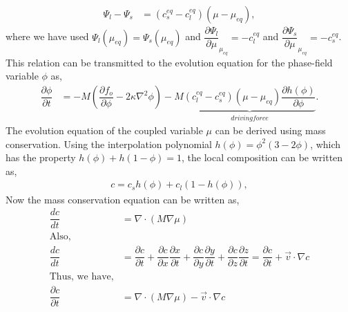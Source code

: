 \documentclass[12pt,a4paper]{report}
\begin{document}
  \begin{align}
   \Psi_l-\Psi_s &= (c_s^{eq} - c_l^{eq})\left(\mu-\mu_{eq}\right),
  \end{align}  
  where we have used $\Psi_l\left(\mu_{eq}\right) = \Psi_s\left(\mu_{eq}\right)$ and $\dfrac{\partial \Psi_l}{\partial \mu}_{\mu_{eq}} = -c_l^{eq}$
  and $\dfrac{\partial \Psi_s}{\partial \mu}_{\mu_{eq}} = -c_s^{eq}$. This relation can be 
  transmitted to the evolution equation for the phase-field variable $\phi$ as,
  \begin{align}
  \dfrac{\partial \phi}{\partial t} &= -M \left(\dfrac{\partial f_o}{\partial \phi} - 2\kappa\nabla^{2}\phi\right)  
					-M\underbrace{(c_l^{eq} - c_s^{eq})\left(\mu-\mu_{eq}\right)\dfrac{\partial h\left(\phi\right)}{\partial \phi}}_{driving force}.
  \end{align}
  The evolution equation of the coupled variable $\mu$ can be derived using mass conservation. 
  Using the interpolation polynomial $h(\phi) = \phi^2\left(3 - 2\phi\right)$, which has the 
  property $h(\phi) + h(1 - \phi) = 1$, the local composition can be written as, 
  \begin{align}
   c = c_s h\left(\phi\right) + c_l (1 - h\left(\phi\right)), 
  \end{align}
Now the mass conservation equation can be written as, 
\begin{align}
 \dfrac{dc}{dt} &= \nabla\cdot\left(M\nabla\mu\right)\\
 \text{Also,}\\
	\dfrac{dc}{dt} &= \dfrac{\partial c}{\partial t} + \dfrac{\partial c}{\partial x}\dfrac{\partial x}{\partial t}
	+\dfrac{\partial c}{\partial y}\dfrac{\partial y}{\partial t}+\dfrac{\partial c}{\partial z}\dfrac{\partial z}{\partial t}
	= \dfrac{\partial c}{\partial t} + \vec{v}\cdot\nabla c\\
	\text{Thus, we have,}\\
	\dfrac{\partial c}{\partial t} &= \nabla\cdot\left(M\nabla\mu\right) - \vec{v}\cdot\nabla c
\label{mass-conservation}
\end{align}
\end{document}
